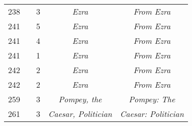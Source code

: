 \documentclass[a4paper,11pt]{article}
\begin{document}
\begin{center}
\begin{tabular}{|c|c|c|c|c|}
    238 & & \hphantom{0}3 & \textit{Ezra} & \textit{From Ezra} \\
    241 & & \hphantom{0}5 & \textit{Ezra} & \textit{From Ezra} \\
    241 & & \hphantom{0}4 & \textit{Ezra} & \textit{From Ezra} \\
    241 & & \hphantom{0}1 & \textit{Ezra} & \textit{From Ezra} \\
    242 & & \hphantom{0}2 & \textit{Ezra} & \textit{From Ezra} \\
    242 & & \hphantom{0}2 & \textit{Ezra} & \textit{From Ezra} \\
    259 & & \hphantom{0}3 & \textit{Pompey, the} & \textit{Pompey: The} \\
    261 & & \hphantom{0}3 & \textit{Caesar, Politician}
           & \textit{Caesar: Politician} \\
    \hline
  \end{tabular}





  \newpage


\end{center}
\end{document}
